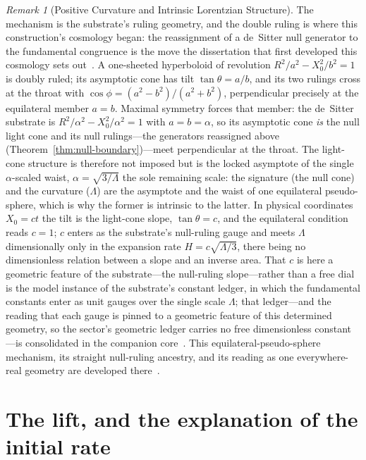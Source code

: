 \documentclass[11pt,a4paper]{article}
\theoremstyle{plain}
\theoremstyle{definition}
\theoremstyle{remark}
\newtheorem{remark}{Remark}
\begin{document}
\begin{remark}[Positive Curvature and Intrinsic Lorentzian Structure]
The mechanism is the substrate's ruling geometry, and the double ruling is where this construction's cosmology began: the reassignment of a de~Sitter null generator to the fundamental congruence is the move the dissertation that first developed this cosmology sets out~\cite{JanzenThesis}. A one-sheeted hyperboloid of revolution $R^2/a^2 - X_0^2/b^2 = 1$ is doubly ruled; its asymptotic cone has tilt $\tan\theta = a/b$, and its two rulings cross at the throat with $\cos\phi = (a^2-b^2)/(a^2+b^2)$, perpendicular precisely at the equilateral member $a=b$. Maximal symmetry forces that member: the de~Sitter substrate is $R^2/\alpha^2 - X_0^2/\alpha^2 = 1$ with $a=b=\alpha$, so its asymptotic cone \emph{is} the null light cone and its null rulings---the generators reassigned above (Theorem~\ref{thm:null-boundary})---meet perpendicular at the throat. The light-cone structure is therefore not imposed but is the locked asymptote of the single $\alpha$-scaled waist, $\alpha=\sqrt{3/\Lambda}$ the sole remaining scale: the signature (the null cone) and the curvature ($\Lambda$) are the asymptote and the waist of one equilateral pseudo-sphere, which is why the former is intrinsic to the latter. In physical coordinates $X_0=ct$ the tilt is the light-cone slope, $\tan\theta = c$, and the equilateral condition reads $c=1$; $c$ enters as the substrate's null-ruling gauge and meets $\Lambda$ dimensionally only in the expansion rate $H=c\sqrt{\Lambda/3}$, there being no dimensionless relation between a slope and an inverse area. That $c$ is here a geometric feature of the substrate---the null-ruling slope---rather than a free dial is the model instance of the substrate's constant ledger, in which the fundamental constants enter as unit gauges over the single scale $\Lambda$; that ledger---and the reading that each gauge is pinned to a geometric feature of this determined geometry, so the sector's geometric ledger carries no free dimensionless constant---is consolidated in the companion core~\cite{JanzenGeometricCore}. This equilateral-pseudo-sphere mechanism, its straight null-ruling ancestry, and its reading as one everywhere-real geometry are developed there~\cite{JanzenGeometricCore,JanzenThesis}.
\end{remark}

\section{The lift, and the explanation of the initial rate}\label{sec:lift-initial-rate}
\end{document}
